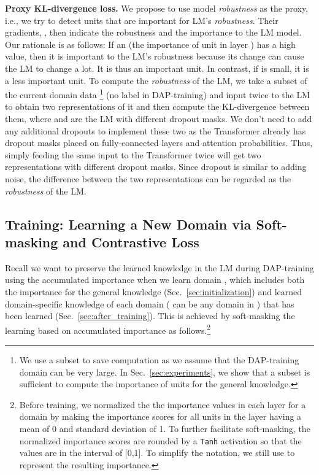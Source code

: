 \documentclass{article} \usepackage{iclr2023_conference,times}
\begin{document}
\textbf{Proxy KL-divergence loss.} 
We propose to use model \textit{robustness} as the proxy, i.e., we try to detect units that are important for LM's \textit{robustness}. Their gradients, , then indicate the robustness and the importance to the LM model. Our rationale is as follows: If an  (the importance of unit  in layer ) has a high value, then it is important to the LM's robustness because its change can cause the LM to change a lot. It is thus an important unit. In contrast, if  is small, it is a less important unit.
To compute the \textit{robustness} of the LM, we take a subset of the current domain data \footnote{{\color{black}We use a subset to save computation as we assume that the DAP-training domain can be very large. In Sec.~\ref{sec:experiments}, we show that a subset is sufficient to compute the importance of units for the general knowledge.}} (no label in DAP-training)
and input  twice to the LM  {\color{black}to obtain two representations of it and then compute the KL-divergence between them}, 
where  and  are the LM with different dropout masks. We don't need to add any additional dropouts to implement these two as 
the Transformer already has dropout masks placed on fully-connected layers and attention probabilities. Thus, simply feeding the same input to the Transformer twice will get two representations with different dropout masks. Since dropout is similar to adding noise, the difference between the two representations can be regarded as the \textit{robustness} of the LM. 











\subsection{Training: Learning a New Domain via Soft-masking and Contrastive Loss}
\label{sec:training}



Recall we want to preserve the learned knowledge in the LM during DAP-training using the accumulated importance  when we learn domain , which includes both the importance for the general knowledge  (Sec.~\ref{sec:initialization}) and learned domain-specific knowledge  of each domain  ( can be any domain in ) that has been learned (Sec.~\ref{sec:after_training}). This is achieved by soft-masking the learning based on accumulated importance as follows.\footnote{{\color{black}Before training, we normalized the the importance values in each layer  for a domain  by making the importance scores for all units in the layer having a mean of 0 and standard deviation of 1. To further facilitate soft-masking, the normalized importance scores are rounded by a \texttt{Tanh} activation so that the values are in the interval of [0,1]. To simplify the notation, we still use  to represent the resulting importance.}}
\end{document}
